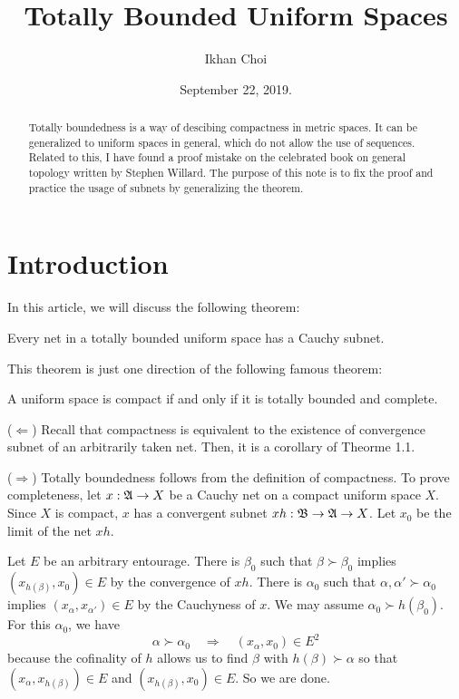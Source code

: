 \documentclass[12pt]{article}
\title{Totally Bounded Uniform Spaces}
\author{Ikhan Choi}
\date{September 22, 2019.}
\begin{document}
\maketitle
\tableofcontents

\begin{abstract}
Totally boundedness is a way of descibing compactness in metric spaces.
It can be generalized to uniform spaces in general, which do not allow the use of sequences.
Related to this, I have found a proof mistake on the celebrated book on general topology written by Stephen Willard.
The purpose of this note is to fix the proof and practice the usage of subnets by generalizing the theorem.
\end{abstract}

\clearpage
\section{Introduction}

In this article, we will discuss the following theorem:

\begin{thm}
Every net in a totally bounded uniform space has a Cauchy subnet.
\end{thm}
This theorem is just one direction of the following famous theorem:

\begin{thm}
A uniform space is compact if and only if it is totally bounded and complete.
\end{thm}

\begin{pf}
($\Leftarrow$)
Recall that compactness is equivalent to the existence of convergence subnet of an arbitrarily taken net.
Then, it is a corollary of Theorme 1.1.

($\Rightarrow$)
Totally boundedness follows from the definition of compactness.
To prove completeness, let $x:\mathfrak{A}\to X$ be a Cauchy net on a compact uniform space $X$.
Since $X$ is compact, $x$ has a convergent subnet $xh:\mathfrak{B}\to\mathfrak{A}\to X$.
Let $x_0$ be the limit of the net $xh$.

Let $E$ be an arbitrary entourage.
There is $\beta_0$ such that $\beta\succ\beta_0$ implies $(x_{h(\beta)},x_0)\in E$ by the convergence of $xh$.
There is $\alpha_0$ such that $\alpha,\alpha'\succ\alpha_0$ implies $(x_\alpha,x_{\alpha'})\in E$ by the Cauchyness of $x$.
We may assume $\alpha_0\succ h(\beta_0)$.
For this $\alpha_0$, we have
\[\alpha\succ\alpha_0\quad\Rightarrow\quad(x_\alpha,x_0)\in E^2\]
because the cofinality of $h$ allows us to find $\beta$ with $h(\beta)\succ\alpha$ so that $(x_\alpha,x_{h(\beta)})\in E$ and $(x_{h(\beta)},x_0)\in E$.
So we are done.
\end{pf}
\end{document}
